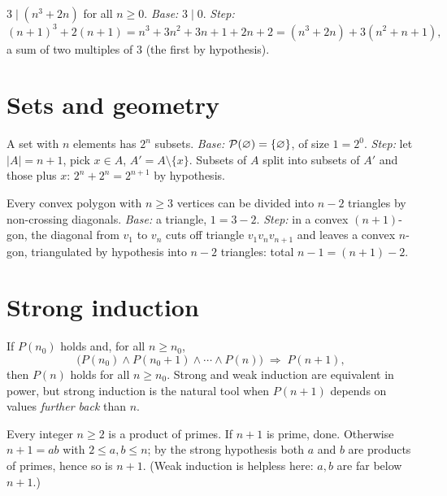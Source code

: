 \begin{example}\label{ex:div}
$3 \mid (n^{3} + 2n)$ for all $n \geq 0$.
\emph{Base:} $3 \mid 0$. \emph{Step:}
\[
(n+1)^{3} + 2(n+1) = n^{3} + 3n^{2} + 3n + 1 + 2n + 2
= (n^{3} + 2n) + 3(n^{2} + n + 1),
\]
a sum of two multiples of $3$ (the first by hypothesis).
\end{example}

\section{Sets and geometry}

\begin{example}[Subsets]
A set with $n$ elements has $2^{n}$ subsets. \emph{Base:}
$\mathcal{P}(\varnothing) = \{\varnothing\}$, of size $1 = 2^0$.
\emph{Step:} let $|A| = n + 1$, pick $x \in A$, $A' = A \setminus \{x\}$.
Subsets of $A$ split into subsets of $A'$ and those plus $x$:
$2^{n} + 2^{n} = 2^{n+1}$ by hypothesis.
\end{example}

\begin{example}[Triangulation]
Every convex polygon with $n \geq 3$ vertices can be divided into $n - 2$
triangles by non-crossing diagonals. \emph{Base:} a triangle, $1 = 3 - 2$.
\emph{Step:} in a convex $(n+1)$-gon, the diagonal from $v_1$ to $v_n$ cuts
off triangle $v_1 v_n v_{n+1}$ and leaves a convex $n$-gon, triangulated by
hypothesis into $n-2$ triangles: total $n - 1 = (n+1) - 2$.
\end{example}

\section{Strong induction}

\begin{theorem}\label{thm:strong}
If $P(n_0)$ holds and, for all $n \geq n_0$,
\[
\bigl(P(n_0) \wedge P(n_0 + 1) \wedge \cdots \wedge P(n)\bigr)
\;\Rightarrow\; P(n+1),
\]
then $P(n)$ holds for all $n \geq n_0$. Strong and weak induction are
equivalent in power, but strong induction is the natural tool when $P(n+1)$
depends on values \emph{further back} than $n$.
\end{theorem}

\begin{example}\label{ex:primefact}
Every integer $n \geq 2$ is a product of primes. If $n + 1$ is prime, done.
Otherwise $n + 1 = ab$ with $2 \le a, b \le n$; by the strong hypothesis
both $a$ and $b$ are products of primes, hence so is $n+1$.
(Weak induction is helpless here: $a, b$ are far below $n + 1$.)
\end{example}

